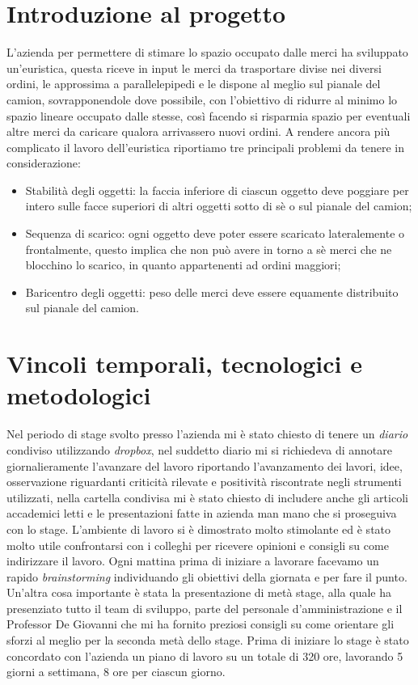 \section{Introduzione al progetto}
L'azienda per permettere di stimare lo spazio occupato dalle merci ha sviluppato un'euristica, questa riceve in input le merci da trasportare divise nei diversi ordini, le approssima a parallelepipedi e le dispone al meglio sul pianale del camion, sovrapponendole dove possibile, con l'obiettivo di ridurre al minimo lo spazio lineare occupato dalle stesse, così facendo si risparmia spazio per eventuali altre merci da caricare qualora arrivassero nuovi ordini.
A rendere ancora più complicato il lavoro dell'euristica riportiamo tre principali problemi da tenere in considerazione:
\begin{itemize}
    \item Stabilità degli oggetti: la faccia inferiore di ciascun oggetto deve poggiare per intero sulle facce superiori di altri oggetti sotto di sè o sul pianale del camion;
    \item Sequenza di scarico: ogni oggetto deve poter essere scaricato lateralemente o frontalmente, questo implica che non può avere in torno a sè merci che ne blocchino lo scarico, in quanto appartenenti ad ordini maggiori;
    \item Baricentro degli oggetti: peso delle merci deve essere equamente distribuito sul pianale del camion.
\end{itemize}

\section{Vincoli temporali, tecnologici e metodologici}
Nel periodo di stage svolto presso l'azienda mi è stato chiesto di tenere un \textit{diario} condiviso utilizzando \textit{dropbox}, nel suddetto diario mi si richiedeva di annotare giornalieramente l'avanzare del lavoro riportando l'avanzamento dei lavori, idee, osservazione riguardanti criticità rilevate e positività riscontrate negli strumenti utilizzati, nella cartella condivisa mi è stato chiesto di includere anche gli articoli accademici letti e le presentazioni fatte in azienda man mano che si proseguiva con lo stage. L'ambiente di lavoro si è dimostrato molto stimolante ed è stato molto utile confrontarsi con i colleghi per ricevere opinioni e consigli su come indirizzare il lavoro. Ogni mattina prima di iniziare a lavorare facevamo un rapido \textit{brainstorming} individuando gli obiettivi della giornata e per fare il punto.
Un'altra cosa importante è stata la presentazione di metà stage, alla quale ha presenziato tutto il team di sviluppo, parte del personale d'amministrazione e il Professor De Giovanni che mi ha fornito preziosi consigli su come orientare gli sforzi al meglio per la seconda metà dello stage.
Prima di iniziare lo stage è stato concordato con l'azienda un piano di lavoro su un totale di 320 ore, lavorando 5 giorni a settimana, 8 ore per ciascun giorno. 

